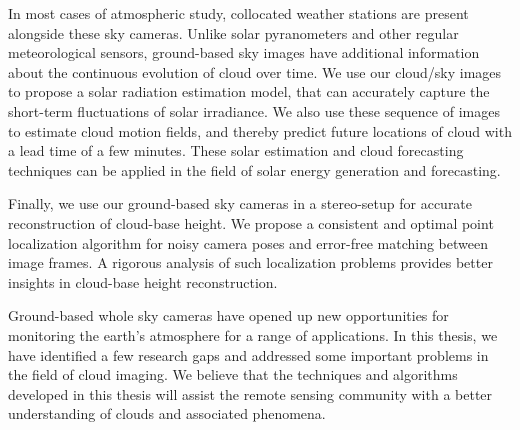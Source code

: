 In most cases of atmospheric study, collocated weather stations are present alongside these sky cameras. Unlike solar pyranometers and other regular meteorological sensors, ground-based sky images have additional information about the continuous evolution of cloud over time. We use our cloud/sky images to propose a solar radiation estimation model, that can accurately capture the short-term fluctuations of solar irradiance. We also use these sequence of images to estimate cloud motion fields, and thereby predict future locations of cloud with a lead time of a few minutes. These solar estimation and cloud forecasting techniques can be applied in the field of solar energy generation and forecasting.

Finally, we use our ground-based sky cameras in a stereo-setup for accurate reconstruction of cloud-base height. We propose a consistent and optimal point localization algorithm for noisy camera poses and error-free matching between image frames. A rigorous analysis of such localization problems provides better insights in cloud-base height reconstruction. 

Ground-based whole sky cameras have opened up new opportunities for monitoring the earth's atmosphere for a range of applications. In this thesis, we have identified a few research gaps and addressed some important problems in the field of cloud imaging. We believe that the techniques and algorithms developed in this thesis will assist the remote sensing community with a better understanding of clouds and associated phenomena. 








